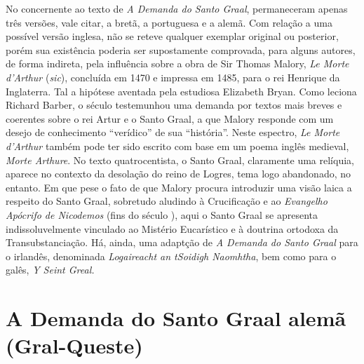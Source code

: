 No concernente ao texto de \textit{A Demanda do Santo Graal}, permaneceram
apenas três versões, vale citar, a bretã, a portuguesa e a alemã. Com relação a
uma possível versão inglesa, não se reteve qualquer exemplar original ou
posterior, porém sua existência poderia ser supostamente comprovada, para
alguns autores, de forma indireta, pela influência sobre a obra de Sir Thomas
Malory, \textit{Le Morte d’Arthur} (\textit{sic}), concluída em 1470 e impressa
em 1485, para o rei Henrique  da Inglaterra. Tal a hipótese aventada pela
estudiosa Elizabeth Bryan. Como leciona Richard Barber, o século  testemunhou
uma demanda por textos mais breves e coerentes sobre o rei Artur e o Santo
Graal, a que Malory responde com um desejo de conhecimento “verídico” de sua
“história”. Neste espectro, \textit{Le Morte d’Arthur} também pode ter sido
escrito com base em um poema inglês medieval, \textit{Morte Arthure}. No texto
quatrocentista, o Santo Graal, claramente uma relíquia, aparece no contexto da
desolação do reino de Logres, tema logo abandonado, no entanto. Em que pese o
fato de que Malory procura introduzir uma visão laica a respeito do Santo
Graal, sobretudo aludindo à Crucificação e ao \textit{Evangelho Apócrifo de
Nicodemos} (fins do século ), aqui o Santo Graal se apresenta
indissoluvelmente vinculado ao Mistério Eucarístico e à doutrina ortodoxa da
Transubstanciação.  Há, ainda, uma adaptção de \textit{A Demanda do Santo
Graal}  para o irlandês, denominada \textit{Logaireacht an tSoidigh Naomhtha},
bem como para o galês, \textit{Y Seint Greal.}

\section{A Demanda do Santo Graal alemã (Gral-Queste)}

